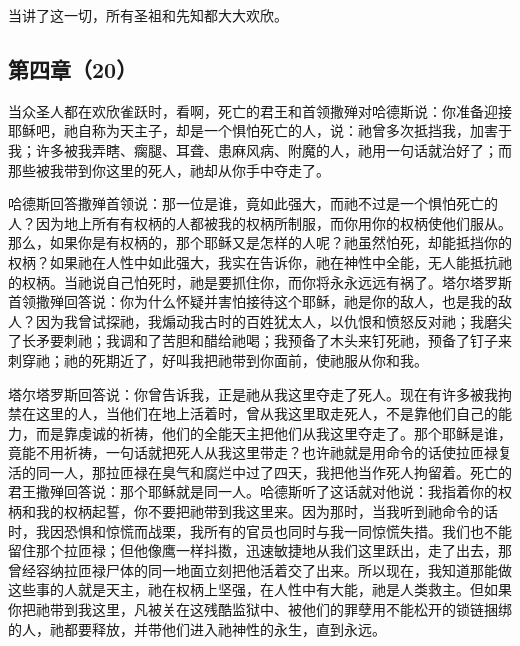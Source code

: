 当讲了这一切，所有圣祖和先知都大大欢欣。\par


\subsection{第四章（20）}

当众圣人都在欢欣雀跃时，看啊，死亡的君王和首领撒殚对哈德斯说：你准备迎接耶稣吧，祂自称为天主子，却是一个惧怕死亡的人，说：祂曾多次抵挡我，加害于我；许多被我弄瞎、瘸腿、耳聋、患麻风病、附魔的人，祂用一句话就治好了；而那些被我带到你这里的死人，祂却从你手中夺走了。\par

哈德斯回答撒殚首领说：那一位是谁，竟如此强大，而祂不过是一个惧怕死亡的人？因为地上所有有权柄的人都被我的权柄所制服，而你用你的权柄使他们服从。那么，如果你是有权柄的，那个耶稣又是怎样的人呢？祂虽然怕死，却能抵挡你的权柄？如果祂在人性中如此强大，我实在告诉你，祂在神性中全能，无人能抵抗祂的权柄。当祂说自己怕死时，祂是要抓住你，而你将永永远远有祸了。塔尔塔罗斯首领撒殚回答说：你为什么怀疑并害怕接待这个耶稣，祂是你的敌人，也是我的敌人？因为我曾试探祂，我煽动我古时的百姓犹太人，以仇恨和愤怒反对祂；我磨尖了长矛要刺祂；我调和了苦胆和醋给祂喝；我预备了木头来钉死祂，预备了钉子来刺穿祂；祂的死期近了，好叫我把祂带到你面前，使祂服从你和我。\par

塔尔塔罗斯回答说：你曾告诉我，正是祂从我这里夺走了死人。现在有许多被我拘禁在这里的人，当他们在地上活着时，曾从我这里取走死人，不是靠他们自己的能力，而是靠虔诚的祈祷，他们的全能天主把他们从我这里夺走了。那个耶稣是谁，竟能不用祈祷，一句话就把死人从我这里带走？也许祂就是用命令的话使拉匝禄复活的同一人，那拉匝禄在臭气和腐烂中过了四天，我把他当作死人拘留着。死亡的君王撒殚回答说：那个耶稣就是同一人。哈德斯听了这话就对他说：我指着你的权柄和我的权柄起誓，你不要把祂带到我这里来。因为那时，当我听到祂命令的话时，我因恐惧和惊慌而战栗，我所有的官员也同时与我一同惊慌失措。我们也不能留住那个拉匝禄；但他像鹰一样抖擞，迅速敏捷地从我们这里跃出，走了出去，那曾经容纳拉匝禄尸体的同一地面立刻把他活着交了出来。所以现在，我知道那能做这些事的人就是天主，祂在权柄上坚强，在人性中有大能，祂是人类救主。但如果你把祂带到我这里，凡被关在这残酷监狱中、被他们的罪孽用不能松开的锁链捆绑的人，祂都要释放，并带他们进入祂神性的永生，直到永远。\par


